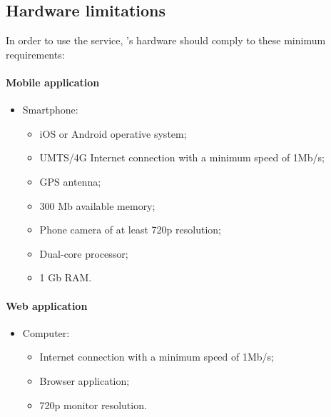 \documentclass[../../../RASD.tex]{subfiles}
\begin{document}
\subsection{Hardware limitations\label{sect:3.4.2}}


In order to use the service, ’s hardware should comply to these minimum requirements:

\paragraph{Mobile application}
\begin{itemize}
	\item Smartphone:
		\begin{itemize}
			\item iOS or Android operative system;
			\item UMTS/4G Internet connection with a minimum speed of 1Mb/s; 
			\item GPS antenna;
			\item 300 Mb available memory;
			\item Phone camera of at least 720p resolution;
			\item Dual-core processor;
			\item 1 Gb RAM.
		\end{itemize}
\end{itemize}

\paragraph{Web application}
\begin{itemize}
	\item Computer:
	\begin{itemize}
		\item Internet connection with a minimum speed of 1Mb/s; 
		\item Browser application;
		\item 720p monitor resolution.
	\end{itemize}
\end{itemize}
\end{document}
